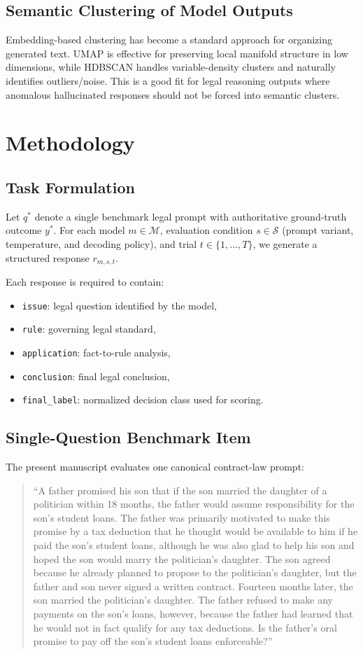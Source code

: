 \documentclass[11pt]{article}
\begin{document}
\subsection{Semantic Clustering of Model Outputs}
Embedding-based clustering has become a standard approach for organizing generated text. UMAP is effective for preserving local manifold structure in low dimensions, while HDBSCAN handles variable-density clusters and naturally identifies outliers/noise. This is a good fit for legal reasoning outputs where anomalous hallucinated responses should not be forced into semantic clusters.

\section{Methodology}
\subsection{Task Formulation}
Let $q^\ast$ denote a single benchmark legal prompt with authoritative ground-truth outcome $y^\ast$. For each model $m \in \mathcal{M}$, evaluation condition $s \in \mathcal{S}$ (prompt variant, temperature, and decoding policy), and trial $t \in \{1,\dots,T\}$, we generate a structured response $r_{m,s,t}$.

Each response is required to contain:
\begin{itemize}[leftmargin=1.5em]
    \item \texttt{issue}: legal question identified by the model,
    \item \texttt{rule}: governing legal standard,
    \item \texttt{application}: fact-to-rule analysis,
    \item \texttt{conclusion}: final legal conclusion,
    \item \texttt{final\_label}: normalized decision class used for scoring.
\end{itemize}

\subsection{Single-Question Benchmark Item}
The present manuscript evaluates one canonical contract-law prompt:
\begin{quote}\small
``A father promised his son that if the son married the daughter of a politician within 18 months, the father would assume responsibility for the son's student loans. The father was primarily motivated to make this promise by a tax deduction that he thought would be available to him if he paid the son's student loans, although he was also glad to help his son and hoped the son would marry the politician's daughter. The son agreed because he already planned to propose to the politician's daughter, but the father and son never signed a written contract. Fourteen months later, the son married the politician's daughter. The father refused to make any payments on the son's loans, however, because the father had learned that he would not in fact qualify for any tax deductions. Is the father's oral promise to pay off the son's student loans enforceable?''
\end{quote}
\end{document}
